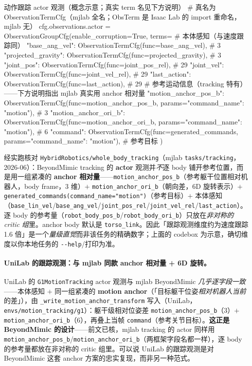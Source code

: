 \begin{codebox}[Python]{动作跟踪 actor 观测（概念示意；真实 term 名见下方说明）}
# 真名为 ObservationTermCfg（mjlab 全名；ObsTerm 是 Isaac Lab 的 import 重命名，mjlab 无）
cfg.observations.actor = ObservationGroupCfg(enable_corruption=True, terms={
    # 本体感知（与速度跟踪同）
    "base_ang_vel":      ObservationTermCfg(func=base_ang_vel),       # 3
    "projected_gravity": ObservationTermCfg(func=projected_gravity),  # 3
    "joint_pos":         ObservationTermCfg(func=joint_pos_rel),      # 29
    "joint_vel":         ObservationTermCfg(func=joint_vel_rel),      # 29
    "last_action":       ObservationTermCfg(func=last_action),        # 29
    # 参考运动信息（tracking 特有）——下方说明指出 mjlab 真实用 anchor 相对量
    "motion_anchor_pos_b": ObservationTermCfg(func=motion_anchor_pos_b,
                                              params={"command_name": "motion"}),  # 3
    "motion_anchor_ori_b": ObservationTermCfg(func=motion_anchor_ori_b,
                                              params={"command_name": "motion"}),  # 6
    "command":             ObservationTermCfg(func=generated_commands,
                                              params={"command_name": "motion"}),  # 参考目标
})
\end{codebox}

\begin{note}
经实跑核对 \texttt{HybridRobotics/whole\_body\_tracking}（mjlab \verb|tasks/tracking|，2026-06）：BeyondMimic tracking 的 \textbf{actor} 观测并\emph{不}逐 body 铺开参考位置，而是用一组紧凑的 \textbf{anchor 相对量}——\verb|motion_anchor_pos_b|（参考躯干位置相对机器人，body frame，3 维）$+$ \verb|motion_anchor_ori_b|（朝向差，6D 旋转表示）$+$ \verb|generated_commands(command_name="motion")|（参考目标）$+$ 本体感知（\verb|base_lin_vel|/\verb|base_ang_vel|/\verb|joint_pos_rel|/\verb|joint_vel_rel|/\verb|last_action|）。逐 body 的参考量（\verb|robot_body_pos_b|/\verb|robot_body_ori_b|）只放在\emph{非对称的 critic 组}里。anchor body 默认是 \verb|torso_link|。因此「跟踪观测维度约为速度跟踪 1.6 倍」是一个\emph{量级直觉}而非该任务的精确数字；上面的 codebox 为示意，确切维度以你本地任务的 \verb|--help|/打印为准。
\end{note}

\paragraph{UniLab 的跟踪观测：与 mjlab 同款 anchor 相对量 + 6D 旋转。}UniLab 的 \verb|G1MotionTracking| actor 观测与 mjlab BeyondMimic \emph{几乎逐字段一致}——本体感知 $+$ 同一组紧凑的 \textbf{motion anchor}（「目标躯干位姿\emph{相对机器人当前}的差」），由 \verb|_write_motion_anchor_transform| 写入（UniLab，\verb|envs/motion_tracking/g1|）：躯干级相对位姿差 \verb|motion_anchor_pos_b|（3）$+$ \verb|motion_anchor_ori_b|（6），再叠上当帧 \verb|command|（参考关节目标）。\textbf{这正是 BeyondMimic 的设计}——前文已核，mjlab tracking 的 actor 同样用 \verb|motion_anchor_pos_b|/\verb|motion_anchor_ori_b|（两框架字段名都一样），逐 body 的参考量都放在非对称的 critic 组里。可以说 UniLab 的跟踪观测是对 BeyondMimic 这套 anchor 方案的忠实复现，而非另一种范式。

